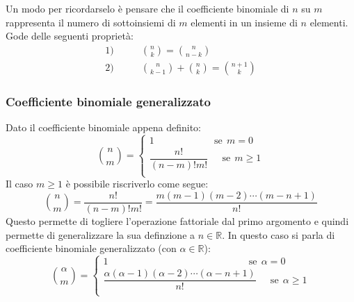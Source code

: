 
Un modo per ricordarselo è pensare che il coefficiente binomiale di $n$ su $m$ rappresenta il numero di sottoinsiemi di $m$ elementi in un insieme di $n$ elementi.\\
Gode delle seguenti proprietà:
\begin{align*}
    1) &\qquad\binom{n}{k} = \binom{n}{n-k}\\[0.2cm]
    2) &\qquad\binom{n}{k-1} + \binom{n}{k} = \binom{n+1}{k}
\end{align*}

\subsubsection{Coefficiente binomiale generalizzato}
Dato il coefficiente binomiale appena definito:
\begin{equation*}
\binom{n}{m}=
    \begin{cases}
    1 \qquad \qquad \qquad \, \mathrm{se}\;\, m = 0\\
    \dfrac{n!}{(n-m)!m!} \quad \;\, \mathrm{se}\;\, m \geq 1\\
    \end{cases}
\end{equation*}
Il caso $m \geq 1$ è possibile riscriverlo come segue:
\begin{equation*}
	\binom{n}{m} = \dfrac{n!}{(n-m)!m!} = \dfrac{m (m - 1) (m -2) \cdots (m - n + 1)}{n!}
\end{equation*}
Questo permette di togliere l'operazione fattoriale dal primo argomento e quindi permette di generalizzare la sua definzione a $n \in \mathbb{R}$. In questo caso si parla di coefficiente binomiale generalizzato (con $\alpha \in \mathbb{R}$):
\begin{equation*}
	\binom{\alpha}{m} = 
		\begin{cases}
			1 \qquad \qquad \qquad \qquad \qquad \qquad \qquad \,\; \mathrm{se}\;\, \alpha = 0\\[5pt]
		\dfrac{\alpha (\alpha - 1) (\alpha -2) \cdots (\alpha - n + 1)}{n!} \quad \;\, \mathrm{se}\;\, \alpha \geq 1\\
		\end{cases}
\end{equation*}



